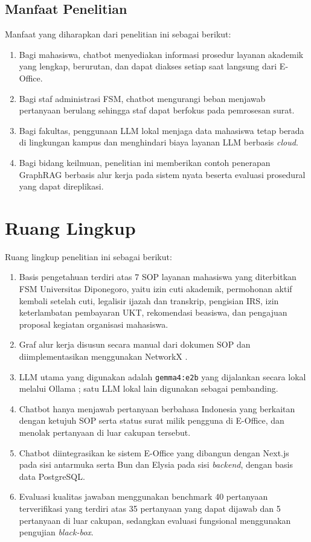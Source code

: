 \subsection{Manfaat Penelitian}
Manfaat yang diharapkan dari penelitian ini sebagai berikut:
\begin{enumerate}
\item Bagi mahasiswa, chatbot menyediakan informasi prosedur layanan akademik yang lengkap, berurutan, dan dapat diakses setiap saat langsung dari E-Office.
\item Bagi staf administrasi FSM, chatbot mengurangi beban menjawab pertanyaan berulang sehingga staf dapat berfokus pada pemrosesan surat.
\item Bagi fakultas, penggunaan LLM lokal menjaga data mahasiswa tetap berada di lingkungan kampus dan menghindari biaya layanan LLM berbasis \textit{cloud}.
\item Bagi bidang keilmuan, penelitian ini memberikan contoh penerapan GraphRAG berbasis alur kerja pada sistem nyata beserta evaluasi prosedural yang dapat direplikasi.
\end{enumerate}

\section{Ruang Lingkup}
\label{sec:ruang-lingkup}
Ruang lingkup penelitian ini sebagai berikut:
\begin{enumerate}
\item Basis pengetahuan terdiri atas 7 SOP layanan mahasiswa yang diterbitkan FSM Universitas Diponegoro, yaitu izin cuti akademik, permohonan aktif kembali setelah cuti, legalisir ijazah dan transkrip, pengisian IRS, izin keterlambatan pembayaran UKT, rekomendasi beasiswa, dan pengajuan proposal kegiatan organisasi mahasiswa. %
\item Graf alur kerja disusun secara manual dari dokumen SOP dan diimplementasikan menggunakan NetworkX \parencite{hagberg2008networkx}.
\item LLM utama yang digunakan adalah \texttt{gemma4:e2b} yang dijalankan secara lokal melalui Ollama \parencite{ollama2023}; satu LLM lokal lain digunakan sebagai pembanding.
\item Chatbot hanya menjawab pertanyaan berbahasa Indonesia yang berkaitan dengan ketujuh SOP serta status surat milik pengguna di E-Office, dan menolak pertanyaan di luar cakupan tersebut.
\item Chatbot diintegrasikan ke sistem E-Office yang dibangun dengan Next.js pada sisi antarmuka serta Bun dan Elysia pada sisi \textit{backend}, dengan basis data PostgreSQL.
\item Evaluasi kualitas jawaban menggunakan benchmark 40 pertanyaan terverifikasi yang terdiri atas 35 pertanyaan yang dapat dijawab dan 5 pertanyaan di luar cakupan, sedangkan evaluasi fungsional menggunakan pengujian \textit{black-box}.
\end{enumerate}

